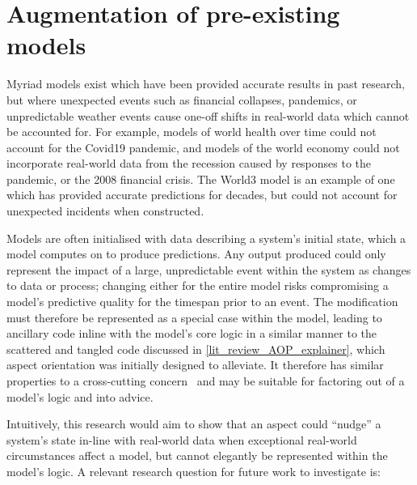 





\section{Augmentation of pre-existing models}\label{future_work_nudge_model_state}

Myriad models exist which have been provided accurate results in past research,
but where unexpected events such as financial collapses, pandemics, or
unpredictable weather events cause one-off shifts in real-world data which
cannot be accounted for. For example, models of world health over time could not
account for the Covid19 pandemic, and models of the world economy could not
incorporate real-world data from the recession caused by responses to the
pandemic, or the 2008 financial crisis. The World3 model is an example of one
which has provided accurate predictions for decades, but could not account for unexpected incidents when constructed.

Models are often initialised with data describing a system's initial state,
which a model computes on to produce predictions. Any output produced could only
represent the impact of a large, unpredictable event within the system as
changes to data or process; changing either for the entire model risks
compromising a model's predictive quality for the timespan prior to an event.
The modification must therefore be represented as a special case within the
model, leading to ancillary code inline with the model's core logic in a similar
manner to the scattered and tangled code discussed in
\cref{lit_review_AOP_explainer}, which aspect orientation was initially designed
to alleviate. It therefore has similar properties to a cross-cutting
concern~\cite{kiczales1997aspect} and may be suitable for factoring out of a
model's logic and into advice.

Intuitively, this research would aim to show that an aspect could ``nudge'' a
system's state in-line with real-world data when exceptional real-world
circumstances affect a model, but cannot elegantly be represented within the
model's logic. A relevant research question for future work to investigate is:

